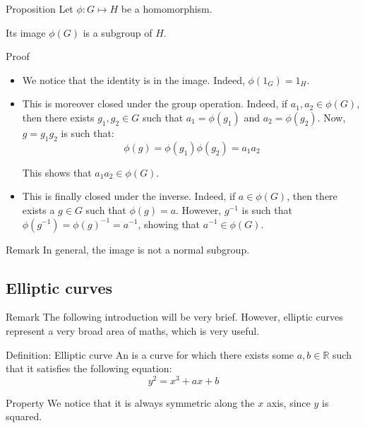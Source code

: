 \documentclass[a4paper]{article}
\begin{document}
\begin{parag}{Proposition}
    Let $\phi: G \mapsto H$ be a homomorphism.

    Its image $\phi\left(G\right)$ is a subgroup of $H$.

    \begin{subparag}{Proof}
        \begin{itemize}[left=0pt]
            \item We notice that the identity is in the image. Indeed, $\phi\left(1_G\right) = 1_H$.
            \item This is moreover closed under the group operation. Indeed, if $a_1, a_2 \in \phi\left(G\right)$, then there exists $g_1, g_2 \in G$ such that $a_1 = \phi\left(g_1\right)$ and $a_2 = \phi\left(g_2\right)$. Now, $g = g_1 g_2$ is such that: 
            \[\phi\left(g\right) = \phi\left(g_1\right)\phi\left(g_2\right) = a_1 a_2\]
            
            This shows that $a_1 a_2 \in \phi\left(G\right)$.
            \item This is finally closed under the inverse. Indeed, if $a \in \phi\left(G\right)$, then there exists a $g \in G$ such that $\phi\left(g\right) = a$. However, $g^{-1}$ is such that $\phi\left(g^{-1}\right) = \phi\left(g\right)^{-1} = a^{-1}$, showing that $a^{-1} \in \phi\left(G\right)$.
        \end{itemize}
    \end{subparag}

    \begin{subparag}{Remark}
        In general, the image is not a normal subgroup.
    \end{subparag}
\end{parag}

\subsection{Elliptic curves}

\begin{parag}{Remark}
    The following introduction will be very brief. However, elliptic curves represent a very broad area of maths, which is very useful.
\end{parag}


\begin{parag}{Definition: Elliptic curve}
    An  is a curve for which there exists some $a, b \in \mathbb{R}$ such that it satisfies the following equation: 
    \[y^2 = x^3 + ax + b\]

    \begin{subparag}{Property}
        We notice that it is always symmetric along the $x$ axis, since $y$ is squared.
    \end{subparag}
\end{parag}
\end{document}

